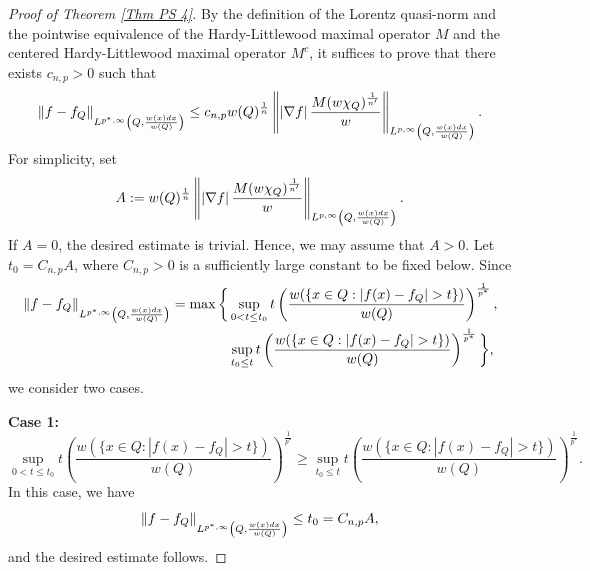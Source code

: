 \documentclass[reqno, 10pt, oneside]{amsart}
\numberwithin{equation}{section}
\newcommand{\strt}[1]{\rule{0pt}{#1}}
\numberwithin{theorem}{section}
\newcommand{\1}{{\rm 1\hspace*{-0.4ex}%
\rule{0.1ex}{1.52ex}\hspace*{0.2ex}}}
\begin{document}
\begin{proof}[Proof of Theorem \ref{Thm PS 4}]
By the definition of the Lorentz quasi-norm and the pointwise equivalence of the Hardy-Littlewood maximal operator $M$ and the centered Hardy-Littlewood maximal operator $M^c$, it suffices to prove that there exists $c_{n,p}>0$ such that 
%
\begin{equation}\label{Thm PS 4 normalized Eq}
    \left\| f-f_Q\right\|_{\strt{2.3ex} L^{p^*,\infty}\left(Q,\frac{w(x)dx}{w(Q)}\right)} \le c_{n,p} w(Q)^\frac{1}{n} \left\| \left| \nabla f \right| \frac{M(w\chi_Q)^\frac{1}{n'}}{w} \right\|_{\strt{2.3ex} L^{p,\infty}\left(Q,\frac{w(x)dx}{w(Q)}\right)}.
\end{equation}
For simplicity, set
\begin{equation*}
    A:=w(Q)^\frac{1}{n} \left\| \left| \nabla f \right| \frac{M(w\chi_Q)^\frac{1}{n'}}{w} \right\|_{\strt{2.3ex}L^{p,\infty}\left(Q,\frac{w(x)dx}{w(Q)}\right)}.
\end{equation*}
If $A=0$, the desired estimate is trivial. Hence, we may assume that $A>0$. Let $t_0= C_{n,p}A$, where $C_{n,p}>0$ is a sufficiently large constant to be fixed below. Since
\begin{align*}
    \left\| f-f_Q\right\|_{\strt{2.3ex}L^{p^*,\infty}\left(Q,\frac{w(x)dx}{w(Q)}\right)} = \max \bigg\{& \sup_{0<t\le t_0} t \left(\frac{w(\{x\in Q:|f(x)-f_Q|>t\})}{w(Q)}\right)^\frac{1}{p^*}, \\
    & \sup_{t_0\le t} t \left(\frac{w(\{x\in Q:|f(x)-f_Q|>t\})}{w(Q)}\right)^\frac{1}{p^*} \bigg\},
\end{align*}
we consider two cases.

\textbf{Case 1:}
\begin{equation*}
    \sup_{0<t\le t_0} t \left(\frac{w(\{x\in Q:|f(x)-f_Q|>t\})}{w(Q)}\right)^\frac{1}{p^*} \ge \sup_{t_0\le t} t \left(\frac{w(\{x\in Q:|f(x)-f_Q|>t\})}{w(Q)}\right)^\frac{1}{p^*}.
\end{equation*}
In this case, we have
\begin{equation*}
    \left\| f-f_Q\right\|_{\strt{2.3ex} L^{p^*,\infty}\left(Q,\frac{w(x)dx}{w(Q)}\right)} \le t_0=C_{n,p}A,
\end{equation*}
and the desired estimate follows.


\end{proof}
\end{document}
